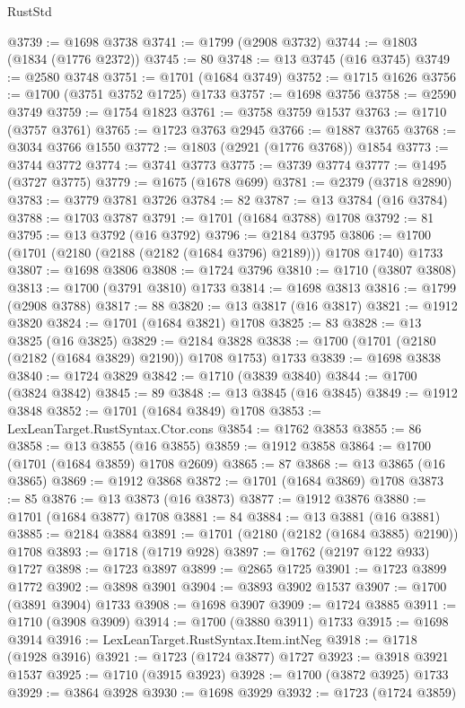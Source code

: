 \begin{lexlean}{RustStd}
\begin{coremodule}
@3739 := @1698 @3738
@3741 := @1799 (@2908 @3732)
@3744 := @1803 (@1834 (@1776 @2372))
@3745 := 80
@3748 := @13 @3745 (@16 @3745)
@3749 := @2580 @3748
@3751 := @1701 (@1684 @3749)
@3752 := @1715 @1626
@3756 := @1700 (@3751 @3752 @1725) @1733
@3757 := @1698 @3756
@3758 := @2590 @3749
@3759 := @1754 @1823
@3761 := @3758 @3759 @1537
@3763 := @1710 (@3757 @3761)
@3765 := @1723 @3763 @2945
@3766 := @1887 @3765
@3768 := @3034 @3766 @1550
@3772 := @1803 (@2921 (@1776 @3768)) @1854
@3773 := @3744 @3772
@3774 := @3741 @3773
@3775 := @3739 @3774
@3777 := @1495 (@3727 @3775)
@3779 := @1675 (@1678 @699)
@3781 := @2379 (@3718 @2890)
@3783 := @3779 @3781 @3726
@3784 := 82
@3787 := @13 @3784 (@16 @3784)
@3788 := @1703 @3787
@3791 := @1701 (@1684 @3788) @1708
@3792 := 81
@3795 := @13 @3792 (@16 @3792)
@3796 := @2184 @3795
@3806 := @1700 (@1701 (@2180 (@2188 (@2182 (@1684 @3796) @2189))) @1708 @1740) @1733
@3807 := @1698 @3806
@3808 := @1724 @3796
@3810 := @1710 (@3807 @3808)
@3813 := @1700 (@3791 @3810) @1733
@3814 := @1698 @3813
@3816 := @1799 (@2908 @3788)
@3817 := 88
@3820 := @13 @3817 (@16 @3817)
@3821 := @1912 @3820
@3824 := @1701 (@1684 @3821) @1708
@3825 := 83
@3828 := @13 @3825 (@16 @3825)
@3829 := @2184 @3828
@3838 := @1700 (@1701 (@2180 (@2182 (@1684 @3829) @2190)) @1708 @1753) @1733
@3839 := @1698 @3838
@3840 := @1724 @3829
@3842 := @1710 (@3839 @3840)
@3844 := @1700 (@3824 @3842)
@3845 := 89
@3848 := @13 @3845 (@16 @3845)
@3849 := @1912 @3848
@3852 := @1701 (@1684 @3849) @1708
@3853 := LexLeanTarget.RustSyntax.Ctor.cons
@3854 := @1762 @3853
@3855 := 86
@3858 := @13 @3855 (@16 @3855)
@3859 := @1912 @3858
@3864 := @1700 (@1701 (@1684 @3859) @1708 @2609)
@3865 := 87
@3868 := @13 @3865 (@16 @3865)
@3869 := @1912 @3868
@3872 := @1701 (@1684 @3869) @1708
@3873 := 85
@3876 := @13 @3873 (@16 @3873)
@3877 := @1912 @3876
@3880 := @1701 (@1684 @3877) @1708
@3881 := 84
@3884 := @13 @3881 (@16 @3881)
@3885 := @2184 @3884
@3891 := @1701 (@2180 (@2182 (@1684 @3885) @2190)) @1708
@3893 := @1718 (@1719 @928)
@3897 := @1762 (@2197 @122 @933) @1727
@3898 := @1723 @3897
@3899 := @2865 @1725
@3901 := @1723 @3899 @1772
@3902 := @3898 @3901
@3904 := @3893 @3902 @1537
@3907 := @1700 (@3891 @3904) @1733
@3908 := @1698 @3907
@3909 := @1724 @3885
@3911 := @1710 (@3908 @3909)
@3914 := @1700 (@3880 @3911) @1733
@3915 := @1698 @3914
@3916 := LexLeanTarget.RustSyntax.Item.intNeg
@3918 := @1718 (@1928 @3916)
@3921 := @1723 (@1724 @3877) @1727
@3923 := @3918 @3921 @1537
@3925 := @1710 (@3915 @3923)
@3928 := @1700 (@3872 @3925) @1733
@3929 := @3864 @3928
@3930 := @1698 @3929
@3932 := @1723 (@1724 @3859)

\end{coremodule}
\end{lexlean}

